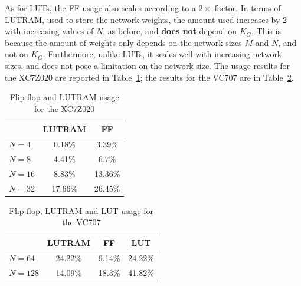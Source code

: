 \documentclass{IEEEtran}
\begin{document}
As for LUTs, the FF usage also scales according to a $2\times$ factor. In terms of LUTRAM, used to store the network weights,
the amount used increases by 2 with increasing values of $N$, as before, and \textbf{does not} depend on $K_G$. This is because
the amount of weights only depends on the network sizes $M$ and $N$, and not on $K_G$. Furthermore, unlike LUTs, it scales well
with increasing network sizes, and does not pose a limitation on the network size. The usage results for the XC7Z020 are reported in Table~\ref{tab:ff};
the results for the VC707 are in Table~\ref{tab:ff-virtx7}.

\begin{table}
	\caption{Flip-flop and LUTRAM usage for the XC7Z020}
	\label{tab:ff}
    \centering
  \begin{tabular}{ | l | c | c |}
    \hline
         & LUTRAM  & FF  \\
    \hline
    $N=4$ & 0.18\%  & 3.39\% \\
    \hline
    $N=8$ & 4.41\%  & 6.7\% \\
    \hline
    $N=16$ & 8.83\%  & 13.36\% \\
    \hline
    $N=32$ & 17.66\% &  26.45\% \\
\hline
  \end{tabular}

\end{table}


\begin{table}
	\caption{Flip-flop, LUTRAM and LUT usage for the VC707}
	\label{tab:ff-virtx7}
    \centering
  \begin{tabular}{ | l | c | c | c |}
    \hline
         & LUTRAM  & FF & LUT \\
    \hline
    $N=64$ & 24.22\%  & 9.14\% & 24.22\% \\
    \hline
    $N=128$ & 14.09\%  & 18.3\% & 41.82\%\\
\hline
  \end{tabular}
\end{table}
\end{document}
